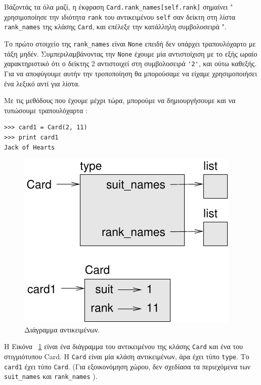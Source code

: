 \documentclass[10pt]{book}
\begin{document}
 Βάζοντάς τα όλα μαζί, η έκφραση  \verb"Card.rank_names[self.rank]"  σημαίνει  
" χρησιμοποίησε την ιδιότητα  {\tt rank}  του αντικειμένου  {\tt self}  
σαν δείκτη στη λίστα  \verb"rank_names"  της κλάσης  {\tt Card},  και επέλεξε 
την κατάλληλη συμβολοσειρά ".

 Το πρώτο στοιχείο της  \verb"rank_names"  είναι  {\tt None}  επειδή δεν 
υπάρχει τραπουλόχαρτο με τάξη μηδέν.  Συμπεριλαμβάνοντας την  {\tt None}  έχουμε 
μία αντιστοίχιση με το εξής ωραίο χαρακτηριστικό ότι ο δείκτης 2 αντιστοιχεί στη 
συμβολοσειρά  \verb"'2'",  και ούτω καθεξής.  Για να αποφύγουμε αυτήν την τροποποίηση θα μπορούσαμε να είχαμε χρησιμοποιήσει ένα λεξικό αντί για λίστα.

Με τις μεθόδους που έχουμε μέχρι τώρα, μπορούμε να δημιουργήσουμε και να τυπώσουμε 
τραπουλόχαρτα :

\begin{verbatim}
>>> card1 = Card(2, 11)
>>> print card1
Jack of Hearts
\end{verbatim}

\begin{figure}
\centerline
{\includegraphics[scale=0.8]{figs/card1.pdf}}
 \caption{Διάγραμμα αντικειμένων.} 
\label{fig.card1}
\end{figure}

 Η Εικόνα~ \ref{fig.card1}  είναι ένα διάγραμμα του αντικειμένου της κλάσης  
{\tt Card}  και ένα του στιγμιότυπου  Card. 
Η  {\tt Card}  είναι μία κλάση αντικειμένων, άρα έχει τύπο   {\tt type}.  
Το  {\tt card1}  έχει τύπο  {\tt Card}.  (Για εξοικονόμηση χώρου, δεν 
σχεδίασα τα περιεχόμενα των  \verb"suit_names"  και  \verb"rank_names" ).
\end{document}
